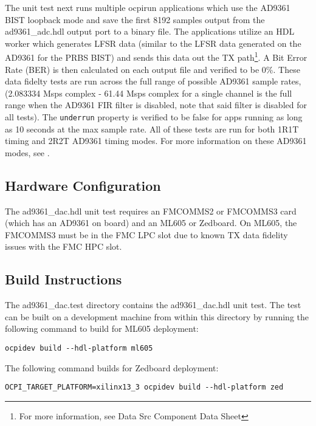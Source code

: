 \documentclass{article}
\def\comp{ad9361\_dac}
\begin{document}
The unit test next runs multiple ocpirun applications which use the AD9361 BIST loopback mode and save the first 8192 samples output from the ad9361\_adc.hdl output port to a binary file. The applications utilize an HDL worker which generates LFSR data (similar to the LFSR data generated on the AD9361 for the PRBS BIST) and sends this data out the TX path\footnote{For more information, see Data Src Component Data Sheet}. A Bit Error Rate (BER) is then calculated on each output file and verified to be 0\%. These data fidelty tests are run across the full range of possible AD9361 sample rates, (2.083334 Msps complex - 61.44 Msps complex for a single channel is the full range when the AD9361 FIR filter is disabled, note that said filter is disabled for all tests). The \verb+underrun+ property is verified to be false for apps running as long as 10 seconds at the max sample rate. All of these tests are run for both 1R1T timing and 2R2T AD9361 timing modes. For more information on these AD9361 modes, see \cite{adi_ug570}.
\subsection*{Hardware Configuration}
The \comp{}.hdl unit test requires an FMCOMMS2 or FMCOMMS3 card (which has an AD9361 on board) and an ML605 or Zedboard. On ML605, the FMCOMMS3 must be in the FMC LPC slot due to known TX data fidelity issues with the FMC HPC slot.
\subsection*{Build Instructions}
The \comp{}.test directory contains the \comp{}.hdl unit test. The test can be built on a development machine from within this directory by running the following command to build for ML605 deployment:
\lstset{language=bash, columns=flexible, breaklines=true, prebreak=\textbackslash, basicstyle=\ttfamily, showstringspaces=false,upquote=true, aboveskip=\baselineskip, belowskip=\baselineskip}
\begin{lstlisting}
ocpidev build --hdl-platform ml605
\end{lstlisting}
The following command builds for Zedboard deployment:
\begin{lstlisting}
OCPI_TARGET_PLATFORM=xilinx13_3 ocpidev build --hdl-platform zed
\end{lstlisting}
\end{document}

